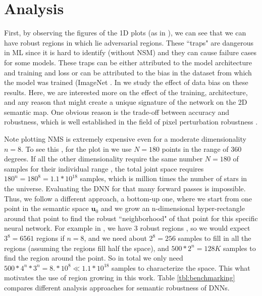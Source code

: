 \section{Analysis} \label{sec:analysis}
First, by observing the figures of the 1D plots (as in \figLabel{\ref{fig:global}}), we can see that we can have robust regions in which lie adversarial regions. These ``traps" are dangerous in ML since it is hard to identify (without NSM) and they can cause failure cases for some models. These traps can be either attributed to the model architecture and training and loss or can be attributed to the bias in the dataset from which the model was trained (\ie ImageNet \cite{IMAGENET}. In \secLabel{\ref{sec:data-bias}} we study the effect of data bias on these results. Here, we are interested more on the effect of the training, architecture, and any reason that might create a unique signature of the network on the 2D semantic map. One obvious reason is the trade-off between accuracy and robustness, which is well established in the field of pixel perturbation robustness \cite{unn-modar,unn-robustness-noise1}. 

Note plotting NMS is extremely expensive even for a moderate dimensionality \eg $n=8$. To see this , for the plot in \figLabel{\ref{fig:intro_fig}} we use $N=180$ points in the range of $360$ degrees. If all the other dimensionality require the same number $N=180$ of samples for their individual range , the total joint  space requires $180^{n} = 180^{8} = 1.1 * 10^{18}$ samples, which is million times the number of stars in the universe. Evaluating the DNN for that many forward passes is impossible. Thus, we follow a different approach, a bottom-up one, where we start from one point in the semantic space $\mathbf{u}_{0}$ and we grow an n-dimensional hyper-rectangle around that point to find the robust ``neighborhood" of that point for this specific neural network. For example in \figLabel{\ref{fig:intro_fig}}, we have 3 robust regions , so we would expect $3^{8}= 6561$ regions if $n=8$, and we need about $2^{8} = 256$ samples to fill in all the regions (assuming the regions fill half the space), and $500*2^{n}= 128K$ samples to find the region around the point. So in total we only need $500*4^{n}*3^{n} = 8. *10^{8} \ll 1.1 * 10^{18}$ samples to characterize the space. This what motivates the use of region growing in this work. Table \ref{tbl:benchmarking} compares different analysis approaches for semantic robustness of DNNs.

